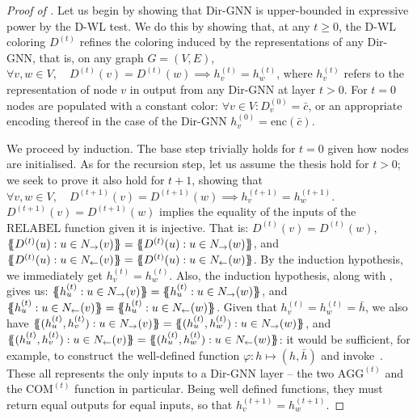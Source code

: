 \documentclass{article}
\newcommand{\inp}{\leftarrow}
\newcommand{\out}{\rightarrow}
\newcommand\oursacro{Dir-GNN}
\newcommand*{\ldblbrace}{\{\mskip-6mu\{}
\newcommand*{\rdblbrace}{\}\mskip-6mu\}}
\theoremstyle{plain}
\theoremstyle{definition}
\theoremstyle{remark}
\begin{document}
\begin{proof}[Proof of ]

Let us begin by showing that \oursacro{} is upper-bounded in expressive power by the D-WL test. We do this by showing that, at any $t \geq 0$, the D-WL coloring $D^{(t)}$ refines the coloring induced by the representations of any \oursacro{}, that is, on any graph $G = (V, E)$, $\forall v, w \in V, \quad D^{(t)}(v) = D^{(t)}(w) \implies h^{(t)}_v = h^{(t)}_w$, where $h^{(t)}_v$ refers to the representation of node $v$ in output from any \oursacro{} at layer $t > 0$. For $t = 0$ nodes are populated with a constant color: $\forall v \in V: D^{(0)}_v = \bar{c}$, or an appropriate encoding thereof in the case of the Dir-GNN $h^{(0)}_v = \textrm{enc}(\bar{c})$.

We proceed by induction. The base step trivially holds for $t=0$ given how nodes are initialised. As for the recursion step, let us assume the thesis hold for $t>0$; we seek to prove it also hold for $t+1$, showing that $\forall v, w \in V, \quad D^{(t+1)}(v) = D^{(t+1)}(w) \implies h^{(t+1)}_v = h^{(t+1)}_w$. $D^{(t+1)}(v) = D^{(t+1)}(w)$ implies the equality of the inputs of the $\textrm{RELABEL}$ function given it is injective. That is: $D^{(t)}(v) = D^{(t)}(w)$, $\ldblbrace D^{(t)}(u) : u \in N_\out(v) \rdblbrace = \ldblbrace D^{(t)}(u) : u \in N_\out(w) \rdblbrace$, and $\ldblbrace D^{(t)}(u) : u \in N_\inp(v) \rdblbrace = \ldblbrace D^{(t)}(u) : u \in N_\inp(w) \rdblbrace$. By the induction hypothesis, we immediately get $h^{(t)}_v = h^{(t)}_w$. Also, the induction hypothesis, along with \citep[Lemma 2]{bevilacqua2022equivariant}, gives us: $\ldblbrace h^{(t)}_u : u \in N_\out(v) \rdblbrace = \ldblbrace h^{(t)}_u : u \in N_\out(w) \rdblbrace$, and $\ldblbrace h^{(t)}_u : u \in N_\inp(v) \rdblbrace = \ldblbrace h^{(t)}_u : u \in N_\inp(w) \rdblbrace$. Given that $h^{(t)}_v = h^{(t)}_w = \bar{h}$, we also have $\ldblbrace (h^{(t)}_u, h^{(t)}_v) : u \in N_\out(v) \rdblbrace = \ldblbrace (h^{(t)}_u, h^{(t)}_w) : u \in N_\out(w) \rdblbrace$, and $\ldblbrace (h^{(t)}_u, h^{(t)}_v) : u \in N_\inp(v) \rdblbrace = \ldblbrace (h^{(t)}_u, h^{(t)}_w) : u \in N_\inp(w) \rdblbrace$: it would be sufficient, for example, to construct the well-defined function $\varphi: h \mapsto (h, \bar{h})$ and invoke~\citep[Lemma 3]{bevilacqua2022equivariant}. These all represents the only inputs to a \oursacro{} layer -- the two $\textrm{AGG}^{(t)}$ and the $\textrm{COM}^{(t)}$ function in particular. Being well defined functions, they must return equal outputs for equal inputs, so that  $h^{(t+1)}_v = h^{(t+1)}_w$.


\end{proof}
\end{document}
